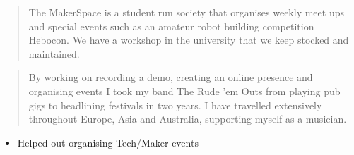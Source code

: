 \documentclass[10pt,a4paper,ragged2e,withhyper]{altacv}
\begin{document}
\begin{paracol}{2}
                
                        \begin{quote}
                The MakerSpace is a student run society that organises weekly meet ups and special events such as an amateur robot building competition Hebocon. We have a workshop in the university that we keep stocked and maintained. 
            \end{quote}
  
            \bigskip
            \begin{quote}
                By working on recording a demo, creating an online presence and organising events I took my band The Rude 'em Outs from playing pub gigs to headlining festivals in two years. I have travelled extensively throughout Europe, Asia and Australia, supporting myself as a musician.
            \end{quote}
            
            
            \bigskip
            
            \begin{itemize}
                \item Helped out organising Tech/Maker events 
            \end{itemize}
        
    \end{paracol}
\end{document}
